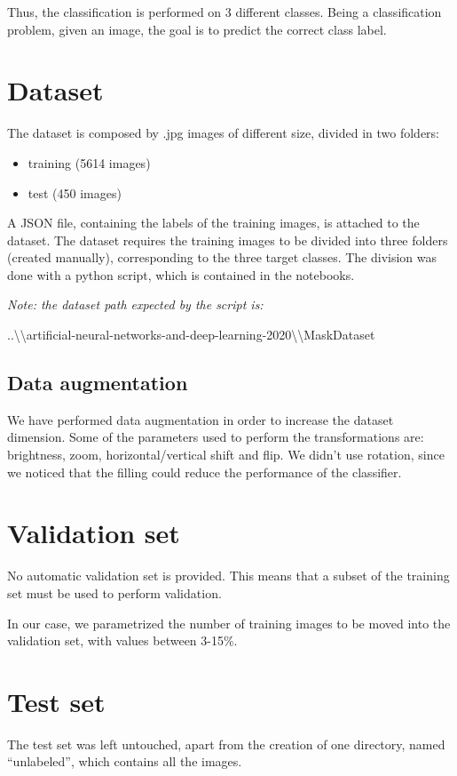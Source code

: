 \documentclass[12pt,a4paper]{report}
\begin{document}
Thus, the classification is performed on 3 different classes. Being a classification problem, given an image, the goal is to predict the correct class label.

	\section{Dataset}

The dataset is composed by .jpg images of different size, divided in two folders:
			\begin{itemize}
				\item training (5614 images)
				\item test (450 images)
			\end{itemize}

A JSON file, containing the labels of the training images, is attached to the dataset.
The dataset requires the training images to be divided into three folders (created manually), corresponding to the three target classes. The division was done with a python script, which is contained in the notebooks.

\textit{Note: the dataset path expected by the script is:}

 ..\textbackslash\textbackslash artificial-neural-networks-and-deep-learning-2020\textbackslash\textbackslash MaskDataset

	\subsection{Data augmentation}
We have performed data augmentation in order to increase the dataset dimension. Some of the parameters used to perform the transformations are: brightness, zoom, horizontal/vertical shift and flip.
We didn't use rotation, since we noticed that the filling could reduce the performance of the classifier.

	\section{Validation set}

No automatic validation set is provided. This means that a subset of the training set must be used to perform validation.

In our case, we parametrized the number of training images to be moved into the validation set, with values between 3-15\%.


	\section{Test set}
The test set was left untouched, apart from the creation of one directory, named ``unlabeled'', which contains all the images.
\end{document}
